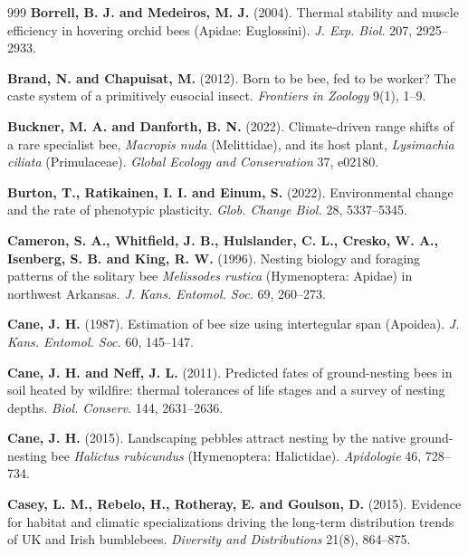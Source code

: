 \documentclass[11pt,a4paper]{article}
\begin{document}
\begin{thebibliography}{999}
\textbf{Borrell, B. J. and Medeiros, M. J.} (2004). Thermal stability and muscle efficiency in hovering orchid bees (Apidae: Euglossini). \textit{J. Exp. Biol.} 207, 2925--2933.

\textbf{Brand, N. and Chapuisat, M.} (2012).
Born to be bee, fed to be worker? The caste system of a primitively eusocial insect.
\textit{Frontiers in Zoology} 9(1), 1--9.

\textbf{Buckner, M. A. and Danforth, B. N.} (2022).
Climate-driven range shifts of a rare specialist bee, \textit{Macropis nuda} (Melittidae), and its host plant, \textit{Lysimachia ciliata} (Primulaceae).
\textit{Global Ecology and Conservation} 37, e02180.

\textbf{Burton, T., Ratikainen, I. I. and Einum, S.} (2022).
Environmental change and the rate of phenotypic plasticity.
\textit{Glob. Change Biol.} 28, 5337--5345.

\textbf{Cameron, S. A., Whitfield, J. B., Hulslander, C. L., Cresko, W. A., Isenberg, S. B. and King, R. W.} (1996). Nesting biology and foraging patterns of the solitary bee \textit{Melissodes rustica} (Hymenoptera: Apidae) in northwest Arkansas. \textit{J. Kans. Entomol. Soc.} 69, 260--273.

\textbf{Cane, J. H.} (1987). Estimation of bee size using intertegular span (Apoidea). \textit{J. Kans. Entomol. Soc.} 60, 145--147.

\textbf{Cane, J. H. and Neff, J. L.} (2011).
Predicted fates of ground-nesting bees in soil heated by wildfire: thermal tolerances of life stages and a survey of nesting depths.
\textit{Biol. Conserv.} 144, 2631--2636.

\textbf{Cane, J. H.} (2015).
Landscaping pebbles attract nesting by the native ground-nesting bee \textit{Halictus rubicundus} (Hymenoptera: Halictidae).
\textit{Apidologie} 46, 728--734.

\textbf{Casey, L. M., Rebelo, H., Rotheray, E. and Goulson, D.} (2015).
Evidence for habitat and climatic specializations driving the long-term distribution trends of UK and Irish bumblebees.
\textit{Diversity and Distributions} 21(8), 864--875.


\end{thebibliography}
\end{document}
